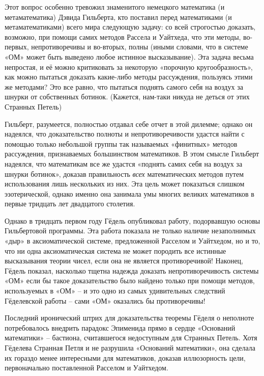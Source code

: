 \documentclass[../main.tex]{subfiles}
\begin{document}
Этот вопрос особенно тревожил знаменитого немецкого математика (и метаматематика) Дэвида Гильберта, кто поставил перед математиками (и метаматематиками) всего мира следующую задачу: со всей строгостью доказать, возможно, при помощи самих методов Рассела и Уайтхеда, что эти методы, во-первых, непротиворечивы и во-вторых, полны (иными словами, что в системе «ОМ» может быть выведено любое истинное высказывание). Эта задача весьма непростая, и её можно критиковать за некоторую «порочную кругообразность», как можно пытаться доказать какие-либо методы рассуждения, пользуясь этими же методами? Это все равно, что пытаться поднять самого себя на воздух за шнурки от собственных ботинок. (Кажется, нам-таки никуда не деться от этих Странных Петель)

Гильберт, разумеется, полностью отдавал себе отчет в этой дилемме; однако он надеялся, что доказательство полноты и непротиворечивости удастся найти с помощью только небольшой группы так называемых «финитных» методов рассуждения, признаваемых большинством математиков. В этом смысле Гильберт надеялся, что математикам все же удастся «поднять самих себя на воздух за шнурки ботинок», доказав правильность \emph{всех} математических методов путем использования лишь нескольких из них. Эта цель может показаться слишком эзотерической, однако именно она занимала умы многих великих математиков в первые тридцать лет двадцатого столетия.

Однако в тридцать первом году Гёдель опубликовал работу, подорвавшую основы Гильбертовой программы. Эта работа показала не только наличие незаполнимых «дыр» в аксиоматической системе, предложенной Расселом и Уайтхедом, но и то, что ни одна аксиоматическая система не может породить все истинные высказывания теории чисел, если она не является противоречивой! Наконец, Гёдель показал, насколько тщетна надежда доказать непротиворечивость системы «ОМ» если бы такое доказательство было найдено только при помощи методов, используемых в «ОМ» \--- и это одно из самых удивительных следствий Гёделевской работы \--- сами «ОМ» оказались бы противоречивы!

Последний иронический штрих для доказательства теоремы Гёделя о неполноте потребовалось внедрить парадокс Эпименида прямо в сердце «Оснований математики» \--- бастиона, считавшегося недоступным для Странных Петель. Хотя Гёделева Странная Петля и не разрушила «Оснований математики», она сделала их гораздо менее интересными для математиков, доказав иллюзорность цели, первоначально поставленной Расселом и Уайтхедом.
\end{document}
